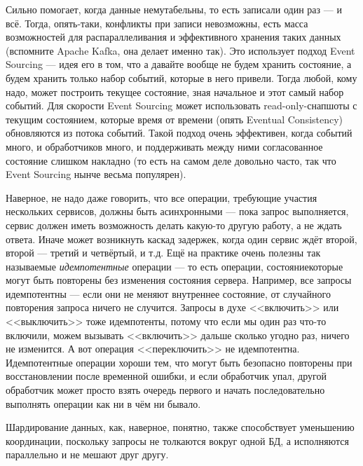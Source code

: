 \documentclass{../text-style}
\begin{document}
Сильно помогает, когда данные немутабельны, то есть записали один раз --- и всё. Тогда, опять-таки, конфликты при записи невозможны, есть масса возможностей для распараллеливания и эффективного хранения таких данных (вспомните Apache Kafka, она делает именно так). Это использует подход Event Sourcing --- идея его в том, что а давайте вообще не будем хранить состояние, а будем хранить только набор событий, которые в него привели. Тогда любой, кому надо, может построить текущее состояние, зная начальное и этот самый набор событий. Для скорости Event Sourcing может использовать read-only-снапшоты с текущим состоянием, которые время от времени (опять Eventual Consistency) обновляются из потока событий. Такой подход очень эффективен, когда событий много, и обработчиков много, и поддерживать между ними согласованное состояние слишком накладно (то есть на самом деле довольно часто, так что Event Sourcing нынче весьма популярен).

Наверное, не надо даже говорить, что все операции, требующие участия нескольких сервисов, должны быть асинхронными --- пока запрос выполняется, сервис должен иметь возможность делать какую-то другую работу, а не ждать ответа. Иначе может возникнуть каскад задержек, когда один сервис ждёт второй, второй --- третий и четвёртый, и т.д. Ещё на практике очень полезны так называемые \emph{идемпотентные} операции --- то есть операции, состояниекоторые могут быть повторены без изменения состояния сервера. Например, все запросы идемпотентны --- если они не меняют внутреннее состояние, от случайного повторения запроса ничего не случится. Запросы в духе <<включить>> или <<выключить>> тоже идемпотенты, потому что если мы один раз что-то включили, можем вызывать <<включить>> дальше сколько угодно раз, ничего не изменится. А вот операция <<переключить>> не идемпотентна. Идемпотентные операции хороши тем, что могут быть безопасно повторены при восстановлении после временной ошибки, и если обработчик упал, другой обработчик может просто взять очередь первого и начать последовательно выполнять операции как ни в чём ни бывало.

Шардирование данных, как, наверное, понятно, также способствует уменьшению координации, поскольку запросы не толкаются вокруг одной БД, а исполняются параллельно и не мешают друг другу.
\end{document}
